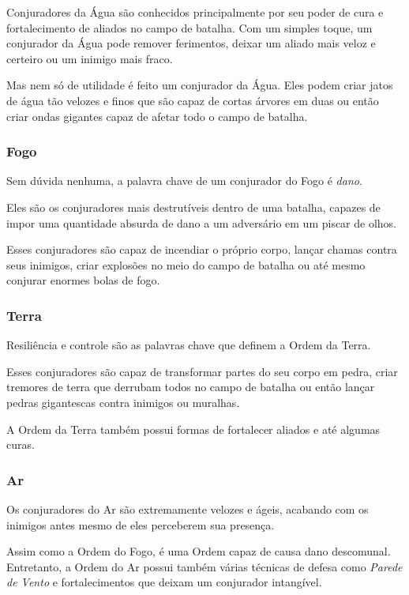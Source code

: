 \documentclass{RPG_Adventure}[2021/10/20]
\begin{document}
\begin{multicols}{2}
Conjuradores da Água são conhecidos principalmente por seu poder de cura e
fortalecimento de aliados no campo de batalha. Com um simples toque, um
conjurador da Água pode remover ferimentos, deixar um aliado mais veloz e
certeiro ou um inimigo mais fraco.

Mas nem só de utilidade é feito um conjurador da Água. Eles podem criar jatos de
água tão velozes e finos que são capaz de cortas árvores em duas ou então criar
ondas gigantes capaz de afetar todo o campo de batalha.

\subsubsection*{Fogo}%

Sem dúvida nenhuma, a palavra chave de um conjurador do Fogo é \textit{dano}.

Eles são os conjuradores mais destrutíveis dentro de uma batalha, capazes de
impor uma quantidade absurda de dano a um adversário em um piscar de olhos.

Esses conjuradores são capaz de incendiar o próprio corpo, lançar chamas contra
seus inimigos, criar explosões no meio do campo de batalha ou até mesmo conjurar
enormes bolas de fogo.

\subsubsection*{Terra}%

Resiliência e controle são as palavras chave que definem a Ordem da Terra.

Esses conjuradores são capaz de transformar partes do seu corpo em pedra, criar
tremores de terra que derrubam todos no campo de batalha ou então lançar pedras
gigantescas contra inimigos ou muralhas.

A Ordem da Terra também possui formas de fortalecer aliados e até algumas curas.

\subsubsection*{Ar}%

Os conjuradores do Ar são extremamente velozes e ágeis, acabando com os inimigos
antes mesmo de eles perceberem sua presença.

Assim como a Ordem do Fogo, é uma Ordem capaz de causa dano descomunal.
Entretanto, a Ordem do Ar possui também várias técnicas de defesa como
\textit{Parede de Vento} e fortalecimentos que deixam um conjurador intangível.


\end{multicols}
\end{document}
